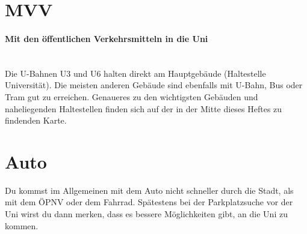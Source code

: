 

\section{MVV}

\paragraph{Mit den öffentlichen Verkehrsmitteln in die Uni}\hfill\\
Die U-Bahnen U3 und U6 halten direkt am Hauptgebäude (Haltestelle Universität). Die meisten anderen Gebäude sind ebenfalls mit U-Bahn, Bus oder Tram gut zu erreichen. Genaueres zu den wichtigsten Gebäuden und naheliegenden Haltestellen finden sich auf der in der Mitte dieses Heftes zu findenden Karte.





\section{Auto}
Du kommst im Allgemeinen mit dem Auto nicht schneller durch die Stadt, als mit dem ÖPNV oder dem Fahrrad. Spätestens bei der Parkplatzsuche vor der Uni wirst du dann merken, dass es bessere Möglichkeiten gibt, an die Uni zu kommen.
